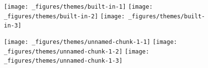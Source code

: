 \begin{Shaded}
\begin{Highlighting}[]
\StringTok{ }\NormalTok{(} \NormalTok{:}\NormalTok{, } \NormalTok{:}\NormalTok{)}
\StringTok{ }\StringTok{ }\NormalTok{()}
\StringTok{ }\NormalTok{() +}\StringTok{ }\NormalTok{(}\NormalTok{)}
\StringTok{ }\NormalTok{() +}\StringTok{ }\NormalTok{(}\NormalTok{)}
\StringTok{ }\NormalTok{() +}\StringTok{ }\NormalTok{(}\NormalTok{)}
\end{Highlighting}
\end{Shaded}

\begin{figure}[H]
  \texttt{[image: \_figures/themes/built-in-1]}%
  \texttt{[image: \_figures/themes/built-in-2]}%
  \texttt{[image: \_figures/themes/built-in-3]}
\end{figure}

\begin{Shaded}
\begin{Highlighting}[]
\StringTok{ }\NormalTok{() +}\StringTok{ }\NormalTok{(}\NormalTok{)}
\StringTok{ }\NormalTok{() +}\StringTok{ }\NormalTok{(}\NormalTok{)}
\StringTok{ }\NormalTok{()  +}\StringTok{ }\NormalTok{(}\NormalTok{)}
\end{Highlighting}
\end{Shaded}

\begin{figure}[H]
  \texttt{[image: \_figures/themes/unnamed-chunk-1-1]}%
  \texttt{[image: \_figures/themes/unnamed-chunk-1-2]}%
  \texttt{[image: \_figures/themes/unnamed-chunk-1-3]}
\end{figure}

\begin{Shaded}
\begin{Highlighting}[]
\StringTok{ }\NormalTok{() +}\StringTok{ }\NormalTok{(}\NormalTok{)}
\StringTok{ }\NormalTok{() +}\StringTok{ }\NormalTok{(}\NormalTok{)}
\end{Highlighting}
\end{Shaded}

